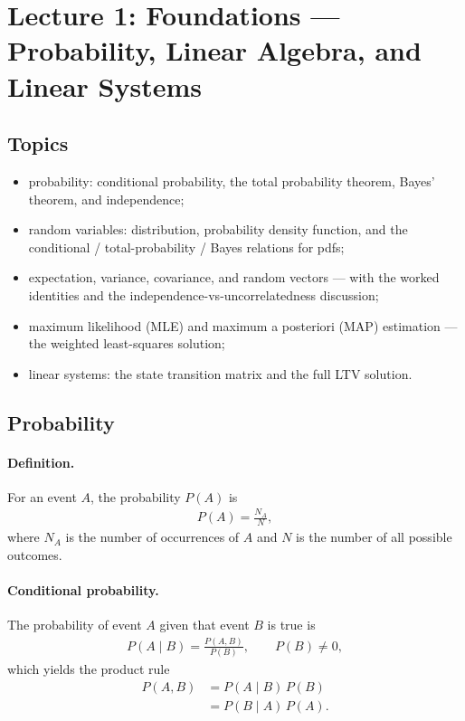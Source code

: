 \section{Lecture 1: Foundations --- Probability, Linear Algebra, and Linear Systems}
\label{sec:lecture01}

\subsection{Topics}
\begin{itemize}[itemsep=0.3em]
\item probability: conditional probability, the total probability theorem, Bayes' theorem, and independence;
\item random variables: distribution, probability density function, and the conditional / total-probability / Bayes relations for pdfs;
\item expectation, variance, covariance, and random vectors --- with the worked identities and the independence-vs-uncorrelatedness discussion;
\item maximum likelihood (MLE) and maximum a posteriori (MAP) estimation --- the weighted least-squares solution;
\item linear systems: the state transition matrix and the full LTV solution.
\end{itemize}

\subsection{Probability}

\paragraph{Definition.}

For an event $A$, the probability $P(A)$ is
\begin{align}
P(A) = \frac{N_A}{N},
\end{align}
where $N_A$ is the number of occurrences of $A$ and $N$ is the number of all possible outcomes.

\paragraph{Conditional probability.}
The probability of event $A$ given that event $B$ is true is
\begin{align}
P(A\mid B) = \frac{P(A,B)}{P(B)}, \qquad P(B)\neq 0,
\end{align}
which yields the product rule
\begin{align}
P(A,B) &= P(A\mid B)\,P(B) \\
&= P(B\mid A)\,P(A).
\end{align}

